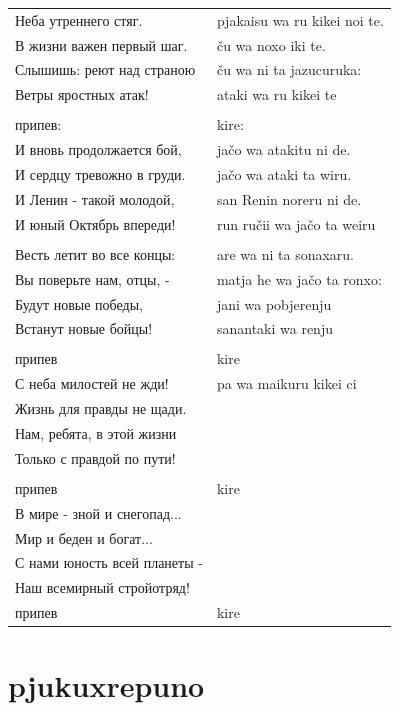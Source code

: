 \documentclass{clgrammar}
\begin{document}
\begin{tabular}{l|l}
	{\cf Неба утреннего стяг.}        & pjakaisu wa ru kikei noi te. \\
	{\cf В жизни важен первый шаг.}   & ču wa noxo iki te. \\ 
	{\cf Слышишь: реют над страною}   & ču wa ni ta jazucuruka: \\
	{\cf 	Ветры яростных атак!}     & ataki wa ru kikei te\\
	& \\
	{\cf 	припев:}                  & kire: \\ 
	{\cf 	И вновь продолжается бой,}  & jačo wa atakitu ni de.  \\
	{\cf 	И сердцу тревожно в груди.} & jačo wa ataki ta wiru.  \\
	{\cf 	И Ленин - такой молодой,}   & san Renin noreru ni de. \\
	{\cf 	И юный Октябрь впереди!}   & run ručii wa jačo ta weiru\\
	& \\		
	{\cf 	Весть летит во все концы:} & are wa ni ta sonaxaru. \\
	{\cf 	Вы поверьте нам, отцы, -}  & matja he wa jačo ta ronxo:\\
	{\cf 	Будут новые победы,}       & jani wa pobjerenju\\
	{\cf 	Встанут новые бойцы!}      & sanantaki wa renju\\
	& \\
	{\cf 	припев}                    & kire \\ 
	{\cf 	С неба милостей не жди!}   & pa wa maikuru kikei ci\\
	{\cf 	Жизнь для правды не щади.} & \\
	{\cf 	Нам, ребята, в этой жизни} & \\
	{\cf 	Только с правдой по пути!} & \\
	& \\
	{\cf 	припев}                    & kire \\ 
	{\cf 	В мире - зной и снегопад...} & \\
	{\cf 	Мир и беден и богат...} & \\
	{\cf 	С нами юность всей планеты -} & \\
	{\cf 	Наш всемирный стройотряд!} & \\
	{\cf 	припев}                  & kire \\ 
\end{tabular}

\chapter{pjukuxrepuno}
\end{document}
